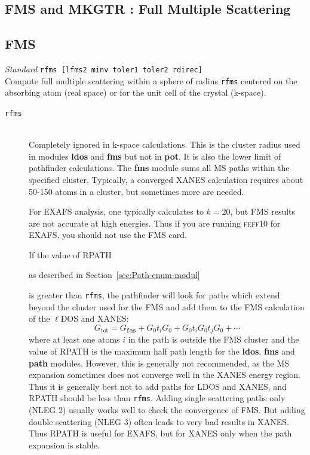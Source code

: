 \documentclass[11pt,oneside]{report} %
\newcommand{\feffcurrent}{\textsc{feff10}}
\renewcommand{\htmlref}[2]{\hyperlink{#2}{#1}}
\newenvironment{Card}[4]%
      {\vspace{3ex}%
        \subsection{#1}
        \quad\textsl{#3}\newline
        \quad\texttt{#2}\newline%
        \label{card:#4}\\}
      {}
\newcommand{\module}[1]{\textrm{\bf{#1}}}
\renewcommand{\htmlref}[2]{{#1}} %
\begin{document}
  \subsection{FMS and MKGTR : Full Multiple Scattering}

\label{sec:Full-mult-scatt}


\begin{Card}{FMS}{rfms  [lfms2 minv toler1 toler2 rdirec]}{Standard}{fms}
  Compute full multiple scattering within a sphere of radius
  \texttt{rfms} centered on the absorbing atom (real space) or for the unit cell of the crystal (k-space).
\begin{description}
  \item[\texttt{rfms}]\hfill\\ Completely ignored in k-space calculations.  This is the cluster radius used in modules 
  \module{ldos} and \module{fms} but not in \module{pot}. It is also the lower 
  limit of pathfinder calculations. The \module{fms} module sums all MS paths within 
  the specified cluster. Typically, a converged XANES calculation requires
  about 50-150 atoms in a cluster, but sometimes more are needed.

  For EXAFS analysis, one typically calculates to $k=20$, but FMS results
  are not accurate at high energies. Thus if you are running
  {\feffcurrent} for EXAFS, you should not use the FMS card.

  If the value of \htmlref{RPATH}{card:rpa} 
  \begin{latexonly}
    as described in Section~\ref{sec:Path-enum-modul}
  \end{latexonly} 
  is greater than \texttt{rfms}, the
  pathfinder will look for paths which extend beyond the cluster used
  for the FMS and add them to the FMS calculation of the $\ell$DOS and
  XANES:
  $$G_{\mathrm{tot}}=G_{\mathtt{fms}} + G_0t_iG_0 +
  G_0t_iG_0t_jG_0+\cdots$$
  where at least one atoms $i$ in the path is outside the FMS cluster
  and the value of RPATH is the maximum half path length for the \module{ldos},
  \module{fms} and \module{path} modules. However, this is generally not recommended,
  as the MS expansion sometimes does not converge well in the XANES energy
  region. Thus it is generally best not to add paths for LDOS and XANES, and
  RPATH should be less than \texttt{rfms}. Adding single scattering
  paths only (NLEG 2) usually works well to check the convergence of
  FMS. But adding double scattering (NLEG 3) often leads to very bad
  results in XANES. Thus RPATH is useful for EXAFS, but for XANES only
  when the path expansion is stable.


\end{description}
\end{Card}
\end{document}
